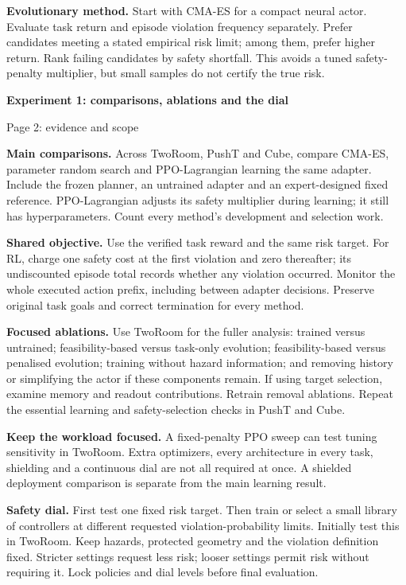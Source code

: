 \documentclass[11pt,a4paper]{article}
\begin{document}
\textbf{Evolutionary method.} Start with CMA-ES for a compact neural actor. Evaluate
task return and episode violation frequency separately. Prefer candidates meeting
a stated empirical risk limit; among them, prefer higher return. Rank failing
candidates by safety shortfall. This avoids a tuned safety-penalty multiplier,
but small samples do not certify the true risk.

\newpage
{\Large\bfseries Experiment 1: comparisons, ablations and the dial}\par
{\small Page 2: evidence and scope}

\textbf{Main comparisons.} Across TwoRoom, PushT and Cube, compare CMA-ES,
parameter random search and PPO-Lagrangian learning the same adapter. Include the
frozen planner, an untrained adapter and an expert-designed fixed reference.
PPO-Lagrangian adjusts its safety multiplier during learning; it still has
hyperparameters. Count every method's development and selection work.

\textbf{Shared objective.} Use the verified task reward and the same risk target.
For RL, charge one safety cost at the first violation and zero thereafter; its
undiscounted episode total records whether any violation occurred. Monitor the
whole executed action prefix, including between adapter decisions. Preserve
original task goals and correct termination for every method.

\textbf{Focused ablations.} Use TwoRoom for the fuller analysis: trained versus
untrained; feasibility-based versus task-only evolution; feasibility-based versus
penalised evolution; training without hazard information; and removing history
or simplifying the actor if these components remain. If using target selection,
examine memory and readout contributions. Retrain removal ablations. Repeat the
essential learning and safety-selection checks in PushT and Cube.

\textbf{Keep the workload focused.} A fixed-penalty PPO sweep can test tuning
sensitivity in TwoRoom. Extra optimizers, every architecture in every task,
shielding and a continuous dial are not all required at once. A shielded
deployment comparison is separate from the main learning result.

\textbf{Safety dial.} First test one fixed risk target. Then train or select a small
library of controllers at different requested violation-probability limits.
Initially test this in TwoRoom. Keep hazards, protected geometry and the violation
definition fixed. Stricter settings request less risk; looser settings permit
risk without requiring it. Lock policies and dial levels before final evaluation.
\end{document}
